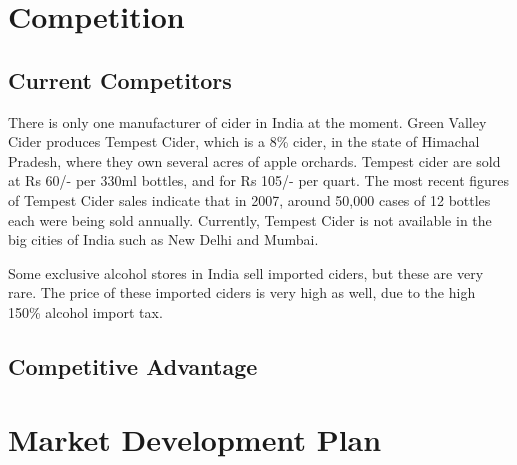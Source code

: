 \documentclass[11pt]{article}
\begin{document}
\section{Competition}
	\subsection{Current Competitors}
		There is only one manufacturer of cider in India at the moment. Green Valley
		Cider produces Tempest Cider, which is a 8\% cider, in the state of Himachal
		Pradesh, where they own several acres of apple orchards. Tempest cider are sold 
		at Rs 60/- per 330ml bottles, and for Rs 105/- per quart. The most recent figures
		of Tempest Cider sales indicate that in 2007, around 50,000 cases of 12 bottles
		each were being sold annually. Currently, Tempest Cider is not available in the
		big cities of India such as New Delhi and Mumbai.

		Some exclusive alcohol stores in India sell imported ciders, but these are very
		rare. The price of these imported ciders is very high as well, due to the high 
		150\% alcohol import tax.

  \subsection{Competitive Advantage}

\newpage

\section{Market Development Plan}
\end{document}
